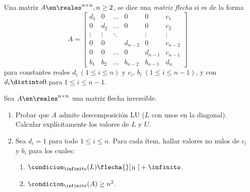 \begin{enunciado}{\ejExtra} 
  Una matriz $A \en \reales^{n \times n}, n\geq 2$, se dice una \textit{matriz flecha} si es de la forma
  $$
    A =
    \begin{bmatrix}
      d_1    & 0      & \ldots & 0       & 0       & c_1     \\
      0      & d_2    & \ldots & 0       & 0       & c_2     \\
      \vdots & \vdots & \ddots &         & \vdots  & \vdots  \\
      0      & 0      &        & d_{n-2} & 0       & c_{n-2} \\
      0      & 0      & \ldots & 0       & d_{n-1} & c_{n-1} \\
      b_1    & b_2    & \ldots & b_{n-2} & b_{n-1} & d_n
    \end{bmatrix}
  $$
  para constantes reales $d_i \ (1 \leq i \leq n)$ y $c_i,\, b_i\ (1 \leq i \leq n-1)$, y con $d_i \distinto 0$ para
  $1 \leq i \leq n-1$.

  Sea $A \en \reales^{n \times n}$ una matriz flecha inversible.
  \begin{enumerate}[label=\alph*)]
    \item Probar que $A$ admite descomposición LU ($L$ con unos en la diagonal). Calcular explícitamente
          los valores de $L$ y $U$.

    \item Sea $d_i = 1$ para todo $1 \leq i \leq n$. Para cada ítem, hallar valores no nulos de $c_i$ y $b_i$ para
          los cuales:
          \begin{enumerate}[label=\roman*)]
            \item $\condicion_\infinito(L) \flecha{}[$n \to \infinito$] + \infinito$.
            \item $\condicion_\infinito(A) \geq n^2$.
          \end{enumerate}
  \end{enumerate}
\end{enunciado}

